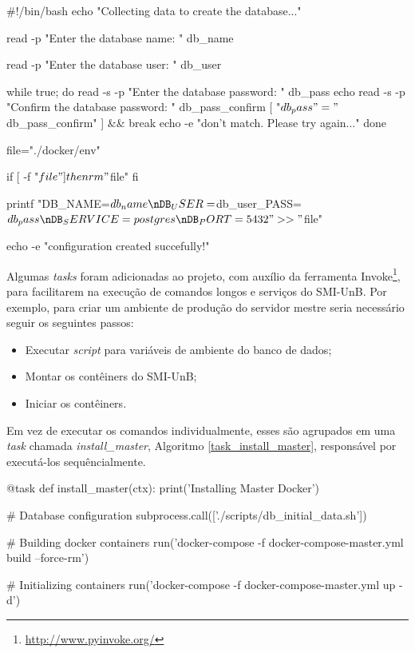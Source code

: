 \begin{python}[caption={\textit{Script} \textit{db\_initial\_data.sh}.}, captionpos=b, label={script_postgres}]
#!/bin/bash
echo "Collecting data to create the database..."

read -p "Enter the database name: " db_name

read -p "Enter the database user: " db_user

while true; do
    read -s -p "Enter the database password: " db_pass
    echo
    read -s -p "Confirm the database password: " db_pass_confirm
    [ "$db_pass" = "$db_pass_confirm" ] && break
    echo -e "\nPasswords don't match. Please try again...\n"
done

file="./docker/env"

if [ -f "$file" ]
then
    rm "$file"
fi

printf "DB_NAME=$db_name\nDB_USER=$db_user\nDB_PASS=$db_pass
        \nDB_SERVICE=postgres\nDB_PORT=5432" >> "$file"

echo -e "\nDatabase configuration created succefully!"
\end{python}

Algumas \textit{tasks} foram adicionadas ao projeto, com auxílio da ferramenta Invoke\footnote{\url{http://www.pyinvoke.org/}}, para facilitarem na execução de comandos longos e serviços do SMI-UnB. Por exemplo, para criar um ambiente de produção do servidor mestre seria necessário seguir os seguintes passos:

\begin{itemize}
    \item Executar \textit{script} para variáveis de ambiente do banco de dados;
    \item Montar os contêiners do SMI-UnB;
    \item Iniciar os contêiners.
\end{itemize}

Em vez de executar os comandos individualmente, esses são agrupados em uma \textit{task} chamada \textit{install\_master}, Algoritmo \ref{task_install_master}, responsável por executá-los sequêncialmente.

\begin{python}[caption={\textit{Task} \textit{install\_master}, presente no arquivo \textit{tasks.py}.}, captionpos=b, label={task_install_master}]
@task
def install_master(ctx):
    print('Installing Master Docker')

    # Database configuration
    subprocess.call(['./scripts/db_initial_data.sh'])

    # Building docker containers
    run('docker-compose -f docker-compose-master.yml build
         --force-rm')

    # Initializing containers
    run('docker-compose -f docker-compose-master.yml up -d')
\end{python}

